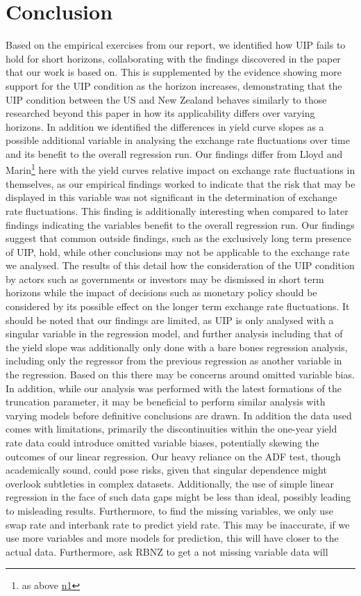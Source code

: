 \documentclass[10pt]{article}
\begin{document}
\section{Conclusion}
Based on the empirical exercises from our report, we identified how UIP fails to hold for short horizons, collaborating with the findings discovered in the \cite{lloyd2020exchange} paper that our work is based on. This is supplemented by the evidence showing more support for the UIP condition as the horizon increases, demonstrating that the UIP condition between the US and New Zealand behaves similarly to those researched beyond this paper in how its applicability differs over varying horizons. In addition we identified the differences in yield curve slopes as a possible additional variable in analysing the exchange rate fluctuations over time and its benefit to the overall regression run. Our findings differ from Lloyd and Marin\footnote{as above \hyperref[lloyd2020exchange]{n1}} here with the yield curves relative impact on exchange rate fluctuations in themselves, as our empirical findings worked to indicate that the risk that may be displayed in this variable was not significant in the determination of exchange rate fluctuations. This finding is additionally interesting when compared to later findings indicating the variables benefit to the overall regression run. Our findings suggest that common outside findings, such as the exclusively long term presence of UIP, hold, while other conclusions may not be applicable to the exchange rate we analysed. The results of this detail how the consideration of the UIP condition by actors such as governments or investors may be dismissed in short term horizons while the impact of decisions such as monetary policy should be considered by its possible effect on the longer term exchange rate fluctuations. It should be noted that our findings are limited, as UIP is only analysed with a singular variable in the regression model, and further analysis including that of the yield slope was additionally only done with a bare bones regression analysis, including only the regressor from the previous regression as another variable in the regression. Based on this there may be concerns around omitted variable bias. In addition, while our analysis was performed with the latest formations of the truncation parameter, it may be beneficial to perform similar analysis with varying models before definitive conclusions are drawn. In addition the data used comes with limitations, primarily the discontinuities within the one-year yield rate data could introduce omitted variable biases, potentially skewing the outcomes of our linear regression. Our heavy reliance on the ADF test, though academically sound, could pose risks, given that singular dependence might overlook subtleties in complex datasets. Additionally, the use of simple linear regression in the face of such data gaps might be less than ideal, possibly leading to misleading results. Furthermore, to find the missing variables, we only use swap rate and interbank rate to predict yield rate. This may be inaccurate, if we use more variables and more models for prediction, this will have closer to the actual data. Furthermore, ask RBNZ to get a not missing variable data will 
\end{document}
